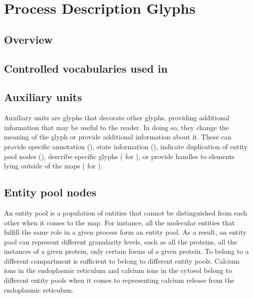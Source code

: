 \chapter{Process Description Glyphs}
\label{chp:glyphs}

\section{Overview}



\section{Controlled vocabularies used in \SBGNPDLone}\label{sec:CVs}



\section{Auxiliary units}

Auxiliary units are glyphs that decorate other glyphs, providing additional information that may be useful to the reader.
In doing so, they change the meaning of the glyph or provide additional information about it.
These can provide specific annotation (), state information (), indicate duplication of entity pool nodes (), describe specific glyphs ( for ), or provide handles to elements lying outside of the maps ( for ).







\section{Entity pool nodes}\label{sec:EPNs}

An entity pool is a population of entities that cannot be distinguished from each other when it comes to the \SBGNPDLone map.
For instance, all the molecular  entities that fulfill the same role in a given process form an entity pool.
As a result, an entity pool can represent different granularity levels, such as all the proteins, all the instances of a given protein, only certain forms of a given protein.
To belong to a different compartment is sufficient to belong to different entity pools.
Calcium ions in the endoplasmic reticulum and calcium ions in the cytosol belong to different entity pools when it comes to representing calcium release from the endoplasmic reticulum.

